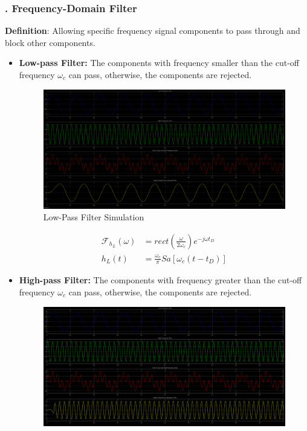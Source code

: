 \documentclass[margin,line]{res}
\begin{document}
\begin{resume}
\subsubsection{. Frequency-Domain Filter}
\textbf{Definition}: Allowing specific frequency signal components to pass through and block other components.
\begin{itemize}
	\item \textbf{Low-pass Filter:} The components with frequency smaller than the cut-off frequency $\omega_c$ can pass, otherwise, the components are rejected. \par
	\begin{minipage}{0.5\linewidth}
		\begin{figure}[H]
			\centering
			\includegraphics[width=0.9\linewidth]{figure/filter/Low-pass}
			\caption*{Low-Pass Filter Simulation}
		\end{figure}
	\end{minipage}
	\begin{minipage}{0.5\linewidth}
		\begin{align}
			\mathscr{F}_{h_L}(\omega) &= rect(\frac{\omega}{2\omega_c}) e^{-j\omega t_D} \nonumber \\
			h_L(t) &= \frac{\omega_c}{\pi}Sa\left[ \omega_c(t-t_D) \right] \nonumber
		\end{align}
	\end{minipage}
	\item \textbf{High-pass Filter:} The components with frequency greater than the cut-off frequency $\omega_c$ can pass, otherwise, the components are rejected. \par
	\begin{minipage}{0.5\linewidth}
		\begin{figure}[H]
			\centering
			\includegraphics[width=0.9\linewidth]{figure/filter/High-pass}

\end{figure}
\end{minipage}
\end{itemize}
\end{resume}
\end{document}
